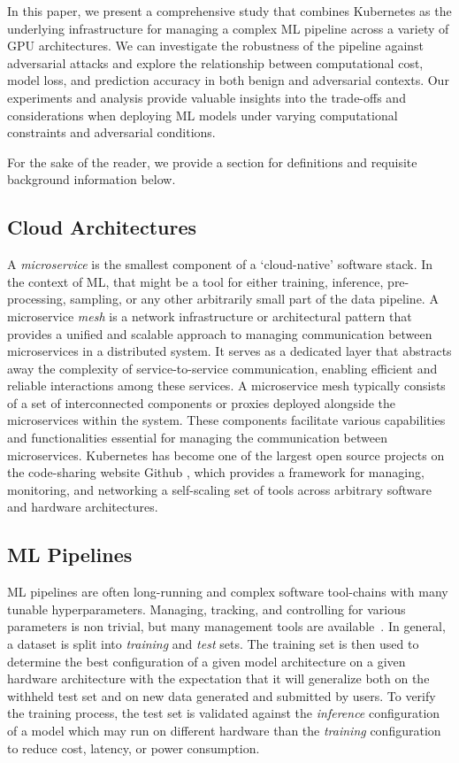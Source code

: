\documentclass[conference]{IEEEtran}
\begin{document}
In this paper, we present a comprehensive study that combines Kubernetes as the underlying infrastructure for managing a complex ML pipeline across a variety of GPU architectures. We can investigate the robustness of the pipeline against adversarial attacks and explore the relationship between computational cost, model loss, and  prediction accuracy in both benign and adversarial contexts. Our experiments and analysis provide valuable insights into the trade-offs and considerations when deploying ML models under varying computational constraints and adversarial conditions.


For the sake of the reader, we provide a section for definitions and requisite background information below.

\subsection{Cloud Architectures}
A \textit{microservice} is the smallest component of a `cloud-native' software stack. In the context of ML, that might be a tool for either training, inference, pre-processing, sampling, or any other arbitrarily small part of the data pipeline. A microservice \textit{mesh} is a network infrastructure or architectural pattern that provides a unified and scalable approach to managing communication between microservices in a distributed system. It serves as a dedicated layer that abstracts away the complexity of service-to-service communication, enabling efficient and reliable interactions among these services. A microservice mesh typically consists of a set of interconnected components or proxies deployed alongside the microservices within the system. These components facilitate various capabilities and functionalities essential for managing the communication between microservices. Kubernetes has become one of the largest open source projects on the code-sharing website Github \cite{k8s-size}, which provides a framework for managing, monitoring, and networking a self-scaling set of tools across arbitrary software and hardware architectures.

\subsection{ML Pipelines}
ML pipelines are often long-running and complex software tool-chains with many tunable hyperparameters. Managing, tracking, and controlling for various parameters is non trivial, but many management tools are available~\cite{dvc,hydra,k8s}. In general, a dataset is split into \textit{training} and \textit{test} sets. The training set is then used to determine the best configuration of a given model architecture on a given hardware architecture with the expectation that it will generalize both on the withheld test set and on new data generated and submitted by users. To verify the training process, the test set is validated against the \textit{inference} configuration of a model which may run on different hardware than the \textit{training} configuration to reduce cost, latency, or power consumption. 
\end{document}
